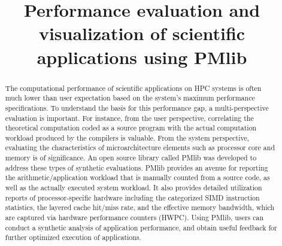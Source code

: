 \documentclass[conference]{IEEEtran}
\begin{document}
\title{
%
%
Performance evaluation and visualization of scientific applications using PMlib
}

\author{
\and
{}
\and
{}
}

\maketitle

\begin{abstract}
The computational performance of scientific applications on HPC systems
is often much lower than user expectation based on the system's maximum
performance specifications.
To understand the basis for this performance gap, a multi-perspective
evaluation is important.
For instance,
from the user perspective, correlating the theoretical computation coded
as a source program with the actual computation workload produced by the
compilers is valuable.
From the system perspective,
evaluating the characteristics of microarchitecture elements such as
processor core and memory is of significance.
An open source library called PMlib was developed to address these types
of synthetic evaluations.
PMlib provides an avenue for reporting the arithmetic/application workload
that is manually counted from a source code,
as well as the actually executed system workload.
It also provides detailed utilization reports of processor-specific hardware
including the categorized SIMD instruction statistics, the layered cache
hit/miss rate, and the effective memory bandwidth,
which are captured via hardware performance counters (HWPC).
Using PMlib, users can conduct a synthetic analysis of application
performance, and obtain useful feedback for further optimized execution
of applications.
\end{abstract}
\end{document}

